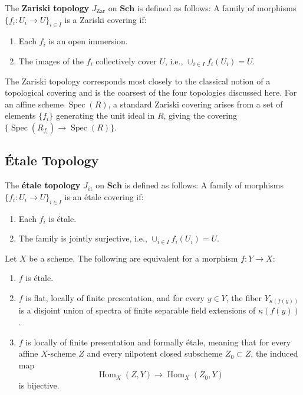 \documentclass[12pt]{article}
\begin{document}
\begin{definition}
    The \textbf{Zariski topology} $J_{\textrm{Zar}}$ on $\mathbf{Sch}$ is defined as follows: A family of morphisms $\{f_i: U_i \to U\}_{i \in I}$ is a Zariski covering if:
    \begin{enumerate}
        \item Each $f_i$ is an open immersion.
        \item The images of the $f_i$ collectively cover $U$, i.e., $\cup_{i \in I} f_i(U_i) = U$.
    \end{enumerate}
\end{definition}

\begin{remark}
    The Zariski topology corresponds most closely to the classical notion of a topological covering and is the coarsest of the four topologies discussed here. For an affine scheme $\operatorname{Spec}(R)$, a standard Zariski covering arises from a set of elements $\{f_i\}$ generating the unit ideal in $R$, giving the covering $\{\operatorname{Spec}(R_{f_i}) \to \operatorname{Spec}(R)\}$.
\end{remark}

\subsection{Étale Topology}

\begin{definition}
    The \textbf{étale topology} $J_{\textrm{ét}}$ on $\mathbf{Sch}$ is defined as follows: A family of morphisms $\{f_i: U_i \to U\}_{i \in I}$ is an étale covering if:
    \begin{enumerate}
        \item Each $f_i$ is étale.
        \item The family is jointly surjective, i.e., $\cup_{i \in I} f_i(U_i) = U$.
    \end{enumerate}
\end{definition}

\begin{proposition}
    Let $X$ be a scheme. The following are equivalent for a morphism $f: Y \to X$:
    \begin{enumerate}
        \item $f$ is étale.
        \item $f$ is flat, locally of finite presentation, and for every $y \in Y$, the fiber $Y_{\kappa(f(y))}$ is a disjoint union of spectra of finite separable field extensions of $\kappa(f(y))$.
        \item $f$ is locally of finite presentation and formally étale, meaning that for every affine $X$-scheme $Z$ and every nilpotent closed subscheme $Z_0 \subset Z$, the induced map \[\operatorname{Hom}_X(Z, Y) \to \operatorname{Hom}_X(Z_0, Y)\] is bijective.
    \end{enumerate}
\end{proposition}
\end{document}
